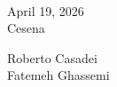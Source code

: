 \documentclass[]{llncs}
\begin{document}



~\bigskip

\noindent
\begin{minipage}[t]{.4\textwidth}
April 19, 2026\\
Cesena
\end{minipage}%
\hfill
\begin{minipage}[t]{.4\textwidth}\flushright
Roberto Casadei\\
Fatemeh Ghassemi
\end{minipage}
\end{document}
